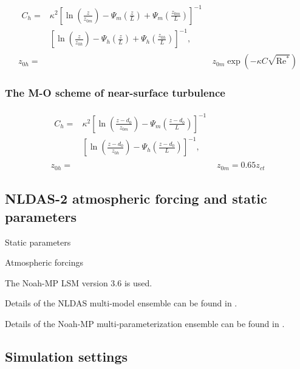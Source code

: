 \documentclass[essd]{copernicus}
\begin{document}
\begin{align}
    \begin{split}
        C_h = & \kappa^2 \left[ \ln\left(\frac{z}{z_{0m}}\right)
            - \Psi_{m}\left(\frac{z}{L}\right)
            + \Psi_{m}\left(\frac{z_{0m}}{L}\right) \right]^{-1} \\
        & \left[ \ln\left(\frac{z}{z_{0h}}\right)
            - \Psi_{h}\left(\frac{z}{L}\right)
            + \Psi_{h}\left(\frac{z_{0h}}{L}\right) \right]^{-1} \text{,}
    \end{split}                                      \\
    z_{0h} = & z_{0m} \exp\left(-\kappa C \sqrt{\text{Re}^*}\right)
\end{align}


\subsubsection{The M-O scheme of near-surface turbulence}

\begin{align}
    \begin{split}
        C_h = & \kappa^2 \left[ \ln\left(\frac{z-d_0}{z_{0m}}\right)
            - \Psi_{m}\left(\frac{z-d_0}{L}\right) \right]^{-1} \\
        & \left[ \ln\left(\frac{z-d_0}{z_{0h}}\right)
            - \Psi_{h}\left(\frac{z-d_0}{L}\right) \right]^{-1}
        \text{,}
    \end{split}      \\
    z_{0h} = & z_{0m} = 0.65 z_{ct}
\end{align}


\subsection{NLDAS-2 atmospheric forcing and static parameters} \label{sec:data:nldas}

Static parameters

Atmospheric forcings

The Noah-MP LSM version 3.6 is used.

Details of the NLDAS multi-model ensemble can be found in \citet{xia2012JGRA, xia2012JGRAa, fei2021WRR}.

Details of the Noah-MP multi-parameterization ensemble can be found in \citet{zheng2019WRR, zheng2020JAMES, fei2021WRR}.


\subsection{Simulation settings} \label{sec:data:simulation}
\end{document}
